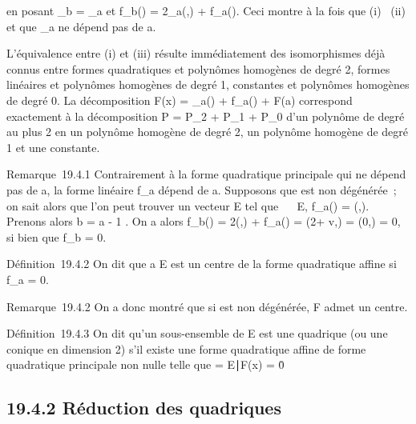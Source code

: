 \documentclass[]{article}
\begin{document}
en posant \Phi_b = \Phi_a et
f_b(\overrightarrow\xi) =
2\phi_a(\overrightarrowab,\overrightarrow\xi)
+ f_a(\overrightarrow\xi). Ceci montre à la
fois que (i) \rigtharrow~(ii) et que \Phi_a ne dépend pas de a.

L'équivalence entre (i) et (iii) résulte immédiatement des isomorphismes
déjà connus entre formes quadratiques et polynômes homogènes de degré 2,
formes linéaires et polynômes homogènes de degré 1, constantes et
polynômes homogènes de degré 0. La décomposition F(x) =
\Phi_a(\overrightarrowax) +
f_a(\overrightarrowax) + F(a) correspond
exactement à la décomposition P = P_2 + P_1 +
P_0 d'un polynôme de degré au plus 2 en un polynôme homogène de
degré 2, un polynôme homogène de degré 1 et une constante.

Remarque~19.4.1 Contrairement à la forme quadratique principale \Phi qui ne
dépend pas de a, la forme linéaire f_a dépend de a. Supposons
que \Phi est non dégénérée~; on sait alors que l'on peut trouver un vecteur
\vecv \in\vec E tel que
\forall~\vec\xi~
\in\vec E, f_a(\vec\xi) =
\phi(\vecv,\vec\xi). Prenons alors b =
a - 1  \vecv. On a alors
f_b(\vec\xi) =
2\phi(\overrightarrowab,\vec\xi) +
f_a(\vec\xi) =
\phi(2\overrightarrowab +\vec
v,\vec\xi) = \phi(0,\vec\xi) = 0, si
bien que f_b = 0.

Définition~19.4.2 On dit que a \in E est un centre de la forme quadratique
affine si f_a = 0.

Remarque~19.4.2 On a donc montré que si \Phi est non dégénérée, F admet un
centre.

Définition~19.4.3 On dit qu'un sous-ensemble \Sigma de E est une quadrique
(ou une conique en dimension 2) s'il existe une forme quadratique affine
de forme quadratique principale non nulle telle que \Sigma =
\x \in E∣F(x) =
0\.

\subsection{19.4.2 Réduction des quadriques}
\end{document}
